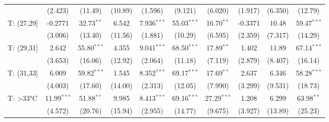 \begin{tabular}{lccccccccc}
                                  & (2.423)                 & (11.49)                   & (10.89)               & (1.596)                 & (9.121)                   & (6.020)               & (1.917)               & (6.350)                 & (12.79)\\   
   T: (27,29]                     & -0.2771                 & 32.73$^{**}$              & 6.542                 & 7.936$^{***}$           & 55.03$^{***}$             & 16.70$^{**}$          & -0.3371               & 10.48                   & 59.47$^{***}$\\   
                                  & (3.006)                 & (13.40)                   & (11.56)               & (1.881)                 & (10.29)                   & (6.595)               & (2.359)               & (7.317)                 & (14.29)\\   
   T: (29,31]                     & 2.642                   & 55.80$^{***}$             & 4.355                 & 9.041$^{***}$           & 68.50$^{***}$             & 17.89$^{**}$          & 1.402                 & 11.89                   & 67.14$^{***}$\\   
                                  & (3.653)                 & (16.06)                   & (12.92)               & (2.064)                 & (11.18)                   & (7.119)               & (2.879)               & (8.407)                 & (16.14)\\   
   T: (31,33]                     & 6.009                   & 59.82$^{***}$             & 1.545                 & 8.352$^{***}$           & 69.17$^{***}$             & 17.69$^{**}$          & 2.637                 & 6.346                   & 58.28$^{***}$\\   
                                  & (4.003)                 & (17.60)                   & (14.00)               & (2.313)                 & (12.05)                   & (7.990)               & (3.299)               & (9.531)                 & (18.73)\\   
   T: >33°C                       & 11.99$^{***}$           & 51.88$^{**}$              & 9.985                 & 8.413$^{***}$           & 69.16$^{***}$             & 27.29$^{***}$         & 1.208                 & 6.299                   & 63.98$^{**}$\\   
                                  & (4.572)                 & (20.76)                   & (15.94)               & (2.955)                 & (14.77)                   & (9.675)               & (3.927)               & (13.89)                 & (25.23)\\   

\end{tabular}
